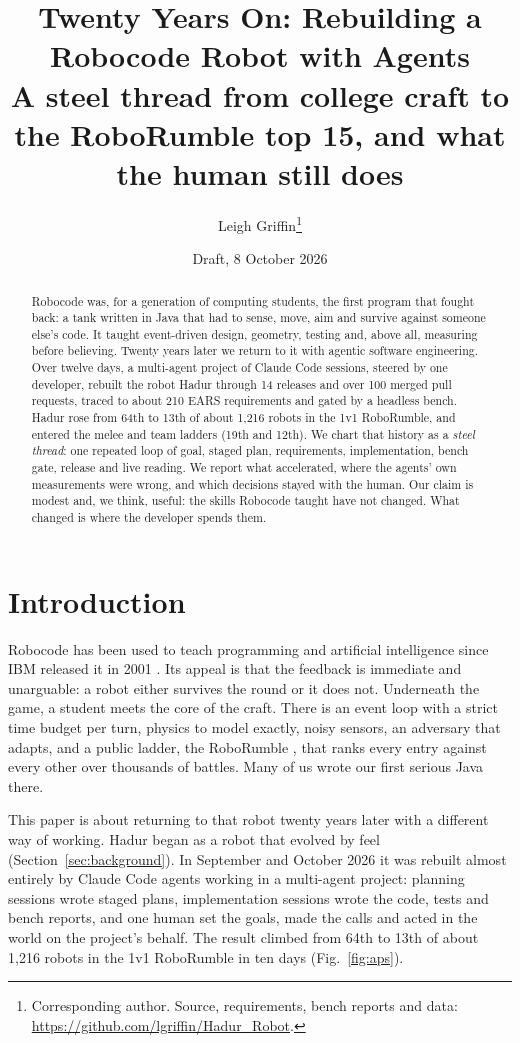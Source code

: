 \documentclass[10pt,twocolumn]{article}
\title{\Large\bfseries Twenty Years On: Rebuilding a Robocode Robot with Agents\\[2pt]
\large A steel thread from college craft to the RoboRumble top 15, and what the human still does}
\author{Leigh Griffin\thanks{Corresponding author. %
Source, requirements, bench reports and data: \url{https://github.com/lgriffin/Hadur_Robot}.}}
\date{Draft, 8 October 2026}
\begin{document}
\maketitle

\begin{abstract}
\noindent Robocode was, for a generation of computing students, the first program that fought back:
a tank written in Java that had to sense, move, aim and survive against someone else's code. It
taught event-driven design, geometry, testing and, above all, measuring before believing. Twenty
years later we return to it with agentic software engineering. Over twelve days, a multi-agent
project of Claude Code sessions, steered by one developer, rebuilt the robot Hadur through 14
releases and over 100 merged pull requests, traced to about 210 EARS requirements and gated by a headless
bench. Hadur rose from 64th to 13th of about 1,216 robots in the 1v1 RoboRumble, and entered the
melee and team ladders (19th and 12th). We chart that history as a \emph{steel thread}: one
repeated loop of goal, staged plan, requirements, implementation, bench gate, release and live
reading. We report what accelerated, where the agents' own measurements were wrong, and which
decisions stayed with the human. Our claim is modest and, we think, useful: the skills Robocode
taught have not changed. What changed is where the developer spends them.
\end{abstract}

\section{Introduction}

Robocode \cite{robocode} has been used to teach programming and artificial intelligence since
IBM released it in 2001 \cite{hartness2004,okelly2006}. Its appeal is that the feedback is
immediate and unarguable: a robot either survives the round or it does not. Underneath the game,
a student meets the core of the craft. There is an event loop with a strict time budget per turn,
physics to model exactly, noisy sensors, an adversary that adapts, and a public ladder, the
RoboRumble \cite{roborumble}, that ranks every entry against every other over thousands of
battles. Many of us wrote our first serious Java there.

This paper is about returning to that robot twenty years later with a different way of working.
Hadur began as a robot that evolved by feel (Section~\ref{sec:background}). In
September and October 2026 it was rebuilt almost entirely by Claude Code agents working in a
multi-agent project: planning sessions wrote staged plans, implementation sessions wrote the
code, tests and bench reports, and one human set the goals, made the calls and acted in the
world on the project's behalf. The result climbed from 64th to 13th of about 1,216 robots in the
1v1 RoboRumble in ten days (Fig.~\ref{fig:aps}).
\end{document}
